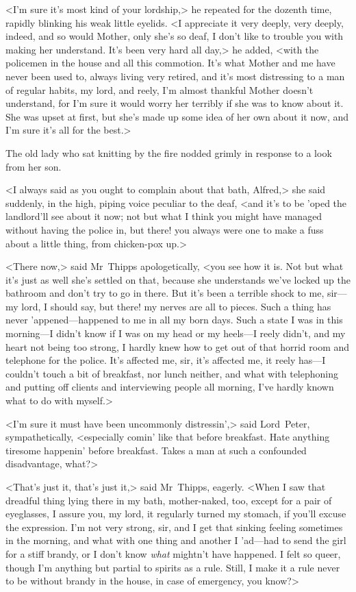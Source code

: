 <I'm sure it's most kind of your lordship,> he repeated for the dozenth time, rapidly blinking his weak little eyelids. <I appreciate it very deeply, very deeply, indeed, and so would Mother, only she's so deaf, I don't like to trouble you with making her understand. It's been very hard all day,> he added, <with the policemen in the house and all this commotion. It's what Mother and me have never been used to, always living very retired, and it's most distressing to a man of regular habits, my lord, and reely, I'm almost thankful Mother doesn't understand, for I'm sure it would worry her terribly if she was to know about it. She was upset at first, but she's made up some idea of her own about it now, and I'm sure it's all for the best.>

The old lady who sat knitting by the fire nodded grimly in response to a look from her son.

<I always said as you ought to complain about that bath, Alfred,> she said suddenly, in the high, piping voice peculiar to the deaf, <and it's to be 'oped the landlord'll see about it now; not but what I think you might have managed without having the police in, but there! you always were one to make a fuss about a little thing, from chicken-pox up.>

<There now,> said Mr~Thipps apologetically, <you see how it is. Not but what it's just as well she's settled on that, because she understands we've locked up the bathroom and don't try to go in there. But it's been a terrible shock to me, sir—my lord, I should say, but there! my nerves are all to pieces. Such a thing has never 'appened—happened to me in all my born days. Such a state I was in this morning—I didn't know if I was on my head or my heels—I reely didn't, and my heart not being too strong, I hardly knew how to get out of that horrid room and telephone for the police. It's affected me, sir, it's affected me, it reely has—I couldn't touch a bit of breakfast, nor lunch neither, and what with telephoning and putting off clients and interviewing people all morning, I've hardly known what to do with myself.>

<I'm sure it must have been uncommonly distressin',> said Lord~Peter, sympathetically, <especially comin' like that before breakfast. Hate anything tiresome happenin' before breakfast. Takes a man at such a confounded disadvantage, what?>

<That's just it, that's just it,> said Mr~Thipps, eagerly. <When I saw that dreadful thing lying there in my bath, mother-naked, too, except for a pair of eyeglasses, I assure you, my lord, it regularly turned my stomach, if you'll excuse the expression. I'm not very strong, sir, and I get that sinking feeling sometimes in the morning, and what with one thing and another I 'ad—had to send the girl for a stiff brandy, or I don't know \textit{what} mightn't have happened. I felt so queer, though I'm anything but partial to spirits as a rule. Still, I make it a rule never to be without brandy in the house, in case of emergency, you know?>

